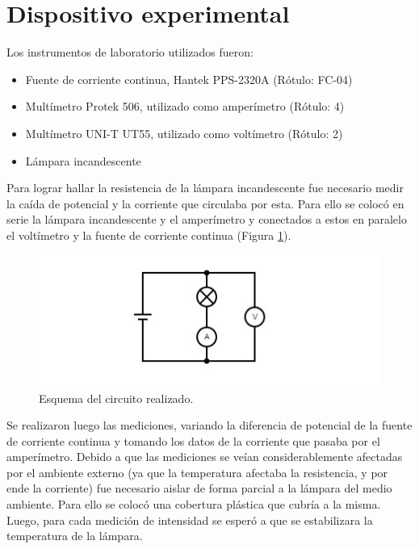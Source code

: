 \documentclass[twoside,twocolumn,a4paper]{article}
\begin{document}

\section{Dispositivo experimental}

Los instrumentos de laboratorio utilizados fueron:
\begin{itemize}
\item 
\label{Fuente} Fuente de corriente continua, Hantek PPS-2320A (R\'otulo: FC-04)
\cite{Fuente}
\item 
\label{amp} Mult\'imetro Protek 506, utilizado como amper\'imetro (R\'otulo: 4)
\cite{amp}
\item 
\label{volt} Mult\'imetro UNI-T UT55, utilizado como volt\'imetro (R\'otulo: 2)
\cite{volt}
\item L\'ampara incandescente
\end{itemize}

Para lograr hallar la resistencia de la l\'ampara incandescente fue necesario medir la ca\'ida de potencial y la corriente que circulaba por esta. Para ello se coloc\'o en serie la l\'ampara incandescente y el amper\'imetro y conectados a estos en paralelo el volt\'imetro y la fuente de corriente continua (Figura \ref{fig:dsp_exp}).\par

\begin{figure}[h]
\includegraphics[width=\linewidth]{dispositivo_experimental.jpg}
\caption{Esquema del circuito realizado.}
\label{fig:dsp_exp}
\end{figure}

Se realizaron luego las mediciones, variando la diferencia de potencial de la fuente de corriente continua y tomando los datos de la corriente que pasaba por el amper\'imetro. Debido a que las mediciones se ve\'ian considerablemente afectadas por el ambiente externo (ya que la temperatura afectaba la resistencia, y por ende la corriente) fue necesario aislar de forma parcial a la l\'ampara del medio ambiente. Para ello se coloc\'o una cobertura pl\'astica que cubr\'ia a la misma. Luego, para cada medici\'on de intensidad se esper\'o a que se estabilizara la temperatura de la l\'ampara.\par
\end{document}
